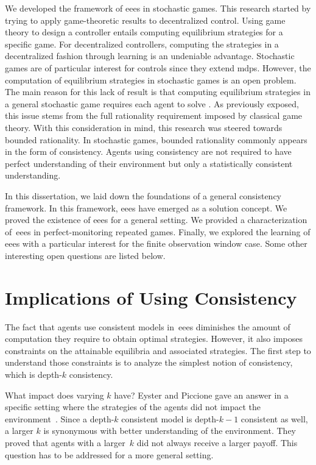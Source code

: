 We developed the framework of \acp{eee} in stochastic games.
This research started by trying to apply game-theoretic results to decentralized control.
Using game theory to design a controller entails computing equilibrium strategies for a specific game.
For decentralized controllers, computing the strategies in a decentralized fashion through learning is an undeniable advantage.
Stochastic games are of particular interest for controls since they extend \acp{mdp}.
However, the computation of equilibrium strategies in stochastic games is an open problem.
The main reason for this lack of result is that computing equilibrium strategies in a general stochastic game requires each agent to solve .
As previously exposed, this issue stems from the full rationality requirement imposed by classical game theory.
With this consideration in mind, this research was steered towards bounded rationality.
In stochastic games, bounded rationality commonly appears in the form of consistency.
Agents using consistency are not required to have perfect understanding of their environment but only a statistically consistent understanding.

In this dissertation, we laid down the foundations of a general consistency framework.
In this framework, \acp{eee} have emerged as a solution concept.
We proved the existence of \acp{eee} for a general setting.
We provided a characterization of~\acp{eee} in perfect-monitoring repeated games.
Finally, we explored the learning of \acp{eee} with a particular interest for the finite observation window case.
Some other interesting open questions are listed below.

\section{Implications of Using Consistency}
The fact that agents use consistent models in~\acp{eee} diminishes the amount of computation they require to obtain optimal strategies.
However, it also imposes constraints on the attainable equilibria and associated strategies.
The first step to understand those constraints is to analyze the simplest notion of consistency, which is depth-\(k\) consistency.

What impact does varying \(k\) have?
Eyster and Piccione gave an answer in a specific setting where the strategies of the agents did not impact the environment~\cite{eyster_piccione:2011}.
Since a depth-\(k\) consistent model is depth-\(k-1\) consistent as well, a larger \(k\) is synonymous with better understanding of the environment.
They proved that agents with a larger~\(k\) did not always receive a larger payoff.
This question has to be addressed for a more general setting.

